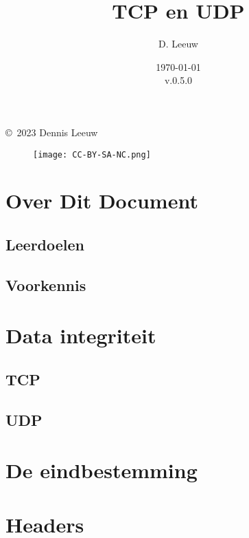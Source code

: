 \documentclass[a4paper,12pt,twoside,openright,titlepage]{book}
\author{D. Leeuw}
\title{TCP en UDP}
\date{\today\\v.0.5.0}
\begin{document}

\maketitle

\copyright\ 2023 Dennis Leeuw\\

\begin{figure}[H]
\texttt{[image: CC-BY-SA-NC.png]}
\end{figure}

\bigskip




\frontmatter
\chapter{Over Dit Document}
%
%
\section{Leerdoelen}

\section{Voorkennis}


\tableofcontents

\mainmatter

\chapter{Data integriteit}

\section{TCP}

\section{UDP}


\chapter{De eindbestemming}


\chapter{Headers}
\end{document}
